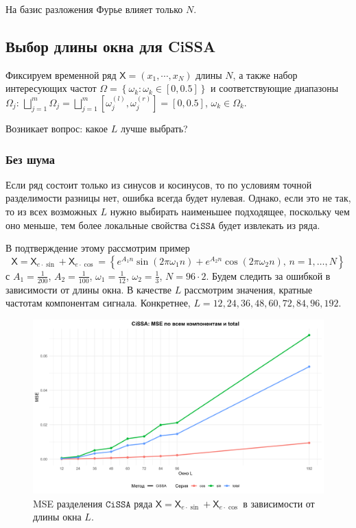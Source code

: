 \documentclass[12pt, specialist, subf
]{disser}
\theoremstyle{definition}
\newcommand{\CISSA}{\texttt{CiSSA}}
\newcommand{\TS}{\mathsf{X}}
\begin{document}
На базис разложения Фурье влияет только $N$.


\subsection{Выбор длины окна для CiSSA}

Фиксируем временной ряд $\TS = \left(x_1, \cdots, x_N\right)$ длины $N$, а также набор интересующих частот $\Omega = \left\{\omega_k: \omega_k \in [0, 0.5] \right\}$ и соответствующие диапазоны $\Omega_j$:
		      $\bigsqcup \limits_{j=1}^m \Omega_j =
			      \bigsqcup \limits_{j=1}^m
			      \left[ \omega_j^{(l)}, \omega_j^{(r)} \right] =
			      [0, 0.5]$, $\omega_k \in \Omega_k$.

Возникает вопрос: какое $L$ лучше выбрать?

\subsubsection*{Без шума}

Если ряд состоит только из синусов и косинусов, то по условиям точной разделимости разницы нет, ошибка всегда будет нулевая. Однако, если это не так, то из всех возможных $L$ нужно выбирать наименьшее подходящее, поскольку чем оно меньше, тем более локальные свойства $\CISSA$ будет извлекать из ряда.

В подтверждение этому рассмотрим пример 
\[\TS = \TS_{e\cdot\sin} + \TS_{e\cdot\cos} =  \left\{ e^{A_1 n } \sin(2\pi \omega_1 n ) + e^{A_2 n} \cos(2\pi \omega_2 n ), \, n = 1, \dots, N \right\} \]
 с $A_1 = \frac{1}{200}$, $A_2 = \frac{1}{100}$, $\omega_1 = \frac{1}{12}$, $\omega_2 = \frac{1}{3}$, $N = 96 \cdot 2$. Будем следить за ошибкой в зависимости от длины окна. В качестве $L$ рассмотрим значения, кратные частотам компонентам сигнала. Конкретнее,  $L = 12, 24, 36, 48, 60, 72, 84, 96, 192$.

\begin{figure}[H]
	\centering
	\includegraphics[width=1\textwidth]{img/cissa_errors_plot.png}
	\caption{MSE разделения $\CISSA$ ряда $\TS = \TS_{e\cdot\sin} + \TS_{e\cdot\cos}$ в зависимости от длины окна $L$.}
	\label{fig:cissa_error_depends_on_L}
\end{figure}
\end{document}
